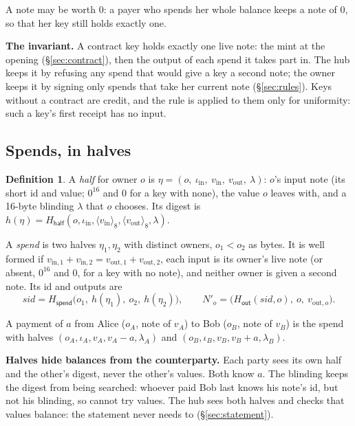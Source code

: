 \documentclass[11pt]{article}
\theoremstyle{plain}
\theoremstyle{definition}
\newtheorem{definition}{Definition}
\newcommand{\be}[2]{\langle #1\rangle_{#2}}
\newcommand{\Ht}[1]{H_{\textsf{#1}}}
\newcommand{\sid}{\mathit{sid}}
\begin{document}
A note may be worth 0: a payer who spends her whole balance keeps a
note of 0, so that her key still holds exactly one.

\textbf{The invariant.} A contract key holds exactly one live note: the
mint at the opening (\S\ref{sec:contract}), then the output of each spend
it takes part in. The hub keeps it by refusing any spend that would give
a key a second note; the owner keeps it by signing only spends that take
her current note (\S\ref{sec:rules}). Keys without a contract are credit,
and the rule is applied to them only for uniformity: such a key's first
receipt has no input.

\subsection{Spends, in halves}\label{sec:spend}

\begin{definition}
A \emph{half} for owner $o$ is $\eta = (o,\ \iota_{\mathrm{in}},\
v_{\mathrm{in}},\ v_{\mathrm{out}},\ \lambda)$: $o$'s input note (its
short id and value; $0^{16}$ and 0 for a key with none), the value $o$
leaves with, and a 16-byte blinding $\lambda$ that $o$ chooses. Its
digest is $h(\eta) = \Ht{half}(o, \iota_{\mathrm{in}},
\be{v_{\mathrm{in}}}{8}, \be{v_{\mathrm{out}}}{8}, \lambda)$.

A \emph{spend} is two halves $\eta_1, \eta_2$ with distinct owners, $o_1
< o_2$ as bytes. It is well formed if $v_{\mathrm{in},1} +
v_{\mathrm{in},2} = v_{\mathrm{out},1} + v_{\mathrm{out},2}$, each input is
its owner's live note (or absent, $0^{16}$ and 0, for a key with no
note), and neither owner is given a second note. Its id and outputs are
\[
  \sid = \Ht{spend}\big(o_1,\ h(\eta_1),\ o_2,\ h(\eta_2)\big),\qquad
  N'_o = \big(\Ht{out}(\sid, o),\ o,\ v_{\mathrm{out}, o}\big).
\]
\end{definition}

A payment of $a$ from Alice ($o_A$, note of $v_A$) to Bob ($o_B$, note
of $v_B$) is the spend with halves $(o_A, \iota_A, v_A, v_A - a,
\lambda_A)$ and $(o_B, \iota_B, v_B, v_B + a, \lambda_B)$.

\textbf{Halves hide balances from the counterparty.} Each party sees
its own half and the other's digest, never the other's values. Both
know $a$. The blinding keeps the digest from being searched: whoever
paid Bob last knows his note's id, but not his blinding, so cannot try
values. The hub sees both halves and checks that values balance: the
statement never needs to (\S\ref{sec:statement}).
\end{document}

